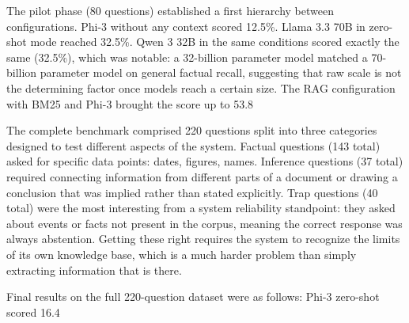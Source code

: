 The pilot phase (80 questions) established a first hierarchy between configurations. Phi-3 without any context scored 12.5\%. Llama 3.3 70B in zero-shot mode reached 32.5\%. Qwen 3 32B in the same conditions scored exactly the same (32.5\%), which was notable: a 32-billion parameter model matched a 70-billion parameter model on general factual recall, suggesting that raw scale is not the determining factor once models reach a certain size. The RAG configuration with BM25 and Phi-3 brought the score up to 53.8%

The complete benchmark comprised 220 questions split into three categories designed to test different aspects of the system. Factual questions (143 total) asked for specific data points: dates, figures, names. Inference questions (37 total) required connecting information from different parts of a document or drawing a conclusion that was implied rather than stated explicitly. Trap questions (40 total) were the most interesting from a system reliability standpoint: they asked about events or facts not present in the corpus, meaning the correct response was always abstention. Getting these right requires the system to recognize the limits of its own knowledge base, which is a much harder problem than simply extracting information that is there.

Final results on the full 220-question dataset were as follows: Phi-3 zero-shot scored 16.4%


